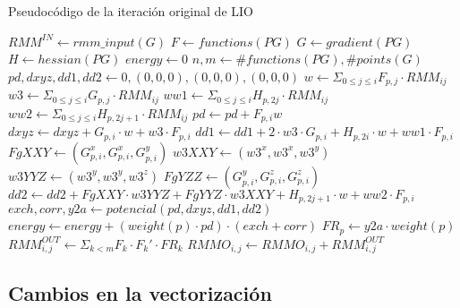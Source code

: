 \begin{algorithm}[H]
        \caption{Pseudoc\'odigo de la iteraci\'on original de LIO}
        \label{algo:lio-iteration}
        \begin{algorithmic}
              \State $RMM^{IN} \gets rmm\_input(G)$
              \State $F \gets functions(PG)$
              \State $G \gets gradient(PG)$
              \State $H \gets hessian(PG)$
              \State $energy \gets 0$
              \State $n,m \gets \# functions(PG), \# points(G)$
              \ForAll{$p \in [0..m)$}
                  \State $pd, dxyz,dd1,dd2 \gets 0, (0,0,0), (0,0,0), (0,0,0)$
                  \ForAll{$i \in [0..n)$}
                      \State $w \gets \Sigma_{0 \leq j \leq i} F_{p,j} \cdot RMM_{ij}$
                      \State $w3 \gets \Sigma_{0 \leq j \leq i} G_{p,j} \cdot RMM_{ij}$
                      \State $ww1 \gets \Sigma_{0 \leq j \leq i} H_{p,2j} \cdot RMM_{ij}$
                      \State $ww2 \gets \Sigma_{0 \leq j \leq i} H_{p,2j+1} \cdot RMM_{ij}$
                      \State $pd \gets pd + F_{p,i} w$
                      \State $dxyz \gets dxyz + G_{p,i} \cdot w + w3 \cdot F_{p,i}$
                      \State $dd1 \gets dd1 + 2 \cdot w3 \cdot G_{p,i} + H_{p,2i} \cdot w + ww1 \cdot F_{p,i}$
                      \State $FgXXY \gets (G_{p,i}^x, G_{p,i}^x, G_{p,i}^y)$
                      \State $w3XXY \gets (w3^x, w3^x, w3^y)$
                      \State $w3YYZ \gets (w3^y, w3^y, w3^z)$
                      \State $FgYZZ \gets (G_{p,i}^y, G_{p,i}^z, G_{p,i}^z)$
                      \State $dd2 \gets dd2 + FgXXY \cdot w3YYZ + FgYYZ \cdot w3XXY + H_{p,2j+1} \cdot w + ww2 \cdot F_{p,i}$
                  \EndFor 
                  \State $exch, corr, y2a \gets potencial(pd, dxyz, dd1, dd2)$
                  \State $energy \gets energy + (weight(p) \cdot pd) \cdot (exch + corr)$
                  \State $FR_p \gets y2a \cdot weight(p)$
              \EndFor
              \State $RMM^{OUT}_{i,j} \gets \Sigma_{k < m} F_k \cdot F_k' \cdot FR_k$
                  \State $RMMO_{i,j} \gets RMMO_{i,j} + RMM^{OUT}_{i,j}$
              \EndFor
            \EndFunction
        \end{algorithmic}
\end{algorithm}

\subsection{Cambios en la vectorizaci\'on}

